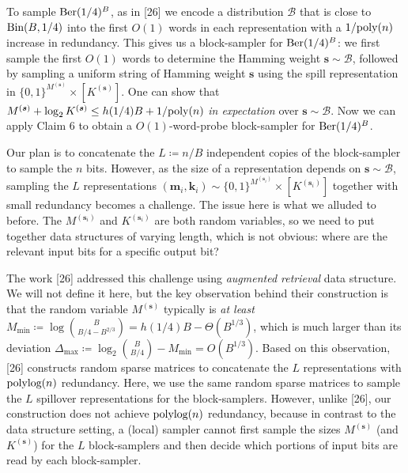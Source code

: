 \documentclass[10pt,a4paper]{article}
\begin{document}
To sample $\textnormal{Ber}(1/4)^{B}$, as in [26] we encode a distribution $\mathcal{B}$ that is close to $\textnormal{Bin}(B,1/4)$ into the first $O(1)$ words in each representation with a $1/\textnormal{poly}(n)$ increase in redundancy.
This gives us a block-sampler for $\textnormal{Ber}(1/4)^{B}$:
we first sample the first $O(1)$ words to determine the Hamming weight $\boldsymbol{s}\sim\mathcal{B}$, followed by sampling a uniform string of Hamming weight $\boldsymbol{s}$ using the spill representation in $\{0,1\}^{M^{(\boldsymbol{s})}}\times[K^{(\boldsymbol{s})}]$.
One can show that $M^{(\boldsymbol{s})}+\log_{2}K^{(\boldsymbol{s})}\leq h(1/4)B+1/\textnormal{poly}(n)$ \emph{in expectation} over $\boldsymbol{s}\sim\mathcal{B}$.
Now we can apply Claim 6 to obtain a $O(1)$-word-probe block-sampler for $\textnormal{Ber}(1/4)^{B}$.\par




Our plan is to concatenate the $L\coloneq n/B$ independent copies of the block-sampler to sample the $n$ bits.
However, as the size of a representation depends on $\boldsymbol{s}\sim\mathcal{B}$, sampling the $L$ representations $(\boldsymbol{m}_{i},\boldsymbol{k}_{i})\sim\{0,1\}^{M^{(\boldsymbol{s}_{i})}}\times[K^{(\boldsymbol{s}_{i})}]$ together with small redundancy becomes a challenge. The issue here is what we alluded to before. The $M^{(\boldsymbol{s}_{i})}$ and $K^{(\boldsymbol{s}_{i})}$ are both random variables, so we need to put together data structures of varying length, which is not obvious: where are the relevant input bits for a specific output bit?\par




The work [26] addressed this challenge using \emph{augmented retrieval} data structure.
We will not define it here, but the key observation behind their construction is that the random variable $M^{(\boldsymbol{s})}$ typically is \emph{at least} $M_{\min}\coloneq\log\binom{B}{B/4-B^{2/3}}=h(1/4)B-\Theta(B^{1/3})$, which is much larger than its deviation $\Delta_{\max}\coloneq\log_{2}\binom{B}{B/4}-M_{\min}=O(B^{1/3})$.
Based on this observation, [26] constructs random sparse matrices to concatenate the $L$ representations with $\textnormal{polylog}(n)$ redundancy. Here, we use the same random sparse matrices to sample the $L$ spillover representations for the block-samplers.
However, unlike [26], our construction does not achieve $\textnormal{polylog}(n)$ redundancy, because in contrast to the data structure setting, a (local) sampler cannot first sample the sizes $M^{(\boldsymbol{s})}$ (and $K^{(\boldsymbol{s})}$) for the $L$ block-samplers and then decide which portions of input bits are read by each block-sampler.\par
\end{document}
